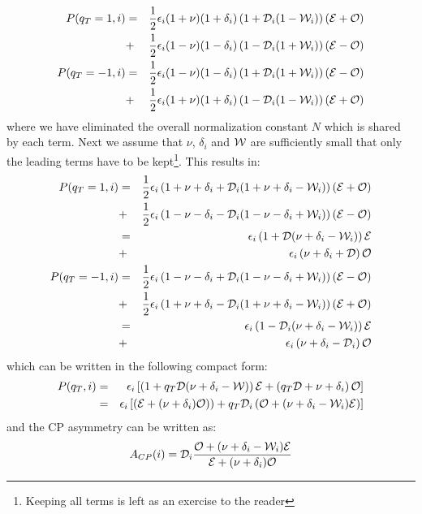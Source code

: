 \documentclass[a4paper,9pt,twoside]{article}
\begin{document}
\begin{eqnarray}
   P(q_T=1,i)  &=&\frac{1}{2} \epsilon_i(1+\nu)(1+\delta_i)\left(1+{\cal D}_i(1-{\cal W}_i)\right)\left({\cal E}+{\cal O}\right)  
\\             &+&\frac{1}{2} \epsilon_i(1-\nu)(1-\delta_i)\left(1-{\cal D}_i(1+{\cal W}_i)\right)\left({\cal E}-{\cal O}\right)  
\\ P(q_T=-1,i) &=&\frac{1}{2} \epsilon_i(1-\nu)(1-\delta_i)\left(1+{\cal D}_i(1+{\cal W}_i)\right)\left({\cal E}-{\cal O}\right) 
\\             &+&\frac{1}{2} \epsilon_i(1+\nu)(1+\delta_i)\left(1-{\cal D}_i(1-{\cal W}_i)\right)\left({\cal E}+{\cal O}\right)
\end{eqnarray}
where we have eliminated the overall normalization constant $N$ which is shared by each term.
Next we assume that $\nu$, $\delta_i$ and ${\cal W}$ are sufficiently small that only the leading 
terms have to be kept\footnote{Keeping all terms is left as an exercise to the reader}. This results in:
\begin{eqnarray}
     P(q_T=1,i)  &=&\frac{1}{2}  \epsilon_i\left(1+\nu+\delta_i+{\cal D}_i(1+\nu+\delta_i-{\cal W}_i)\right)\left({\cal E}+{\cal O}\right)
\\               &+&\frac{1}{2}  \epsilon_i\left(1-\nu-\delta_i-{\cal D}_i(1-\nu-\delta_i+{\cal W}_i)\right)\left({\cal E}-{\cal O}\right)
\\               &=& \epsilon_i\left(1            +{\cal D}(  \nu+\delta_i-{\cal W}_i) \right){\cal E}
\\               &+& \epsilon_i\left( \nu+\delta_i+{\cal D}  \right){\cal O}
\\   P(q_T=-1,i) &=&\frac{1}{2}  \epsilon_i\left(1-\nu-\delta_i+{\cal D}_i(1-\nu-\delta_i+{\cal W}_i)\right)\left({\cal E}-{\cal O}\right)
\\               &+&\frac{1}{2}  \epsilon_i\left(1+\nu+\delta_i-{\cal D}_i(1+\nu+\delta_i-{\cal W}_i)\right)\left({\cal E}+{\cal O}\right)
\\               &=& \epsilon_i\left(1-{\cal D}_i(\nu+\delta_i-{\cal W}_i )  \right){\cal E}
\\               &+& \epsilon_i\left( \nu+\delta_i-{\cal D}_i \right){\cal O}
\end{eqnarray}
which can be written in the following compact form:
\begin{eqnarray}
     P(q_T,i)  &=& \epsilon_i\left[\left(1            +q_T{\cal D}(  \nu+\delta_i-{\cal W}) \right){\cal E} + \left( q_T{\cal D} +\nu+\delta_i \right){\cal O}\right] \\
               &=& \epsilon_i\left[\left({\cal E}+(\nu+\delta_i){\cal O})  \right) + q_T {\cal D}_i \left({\cal O}+(\nu+\delta_i-{\cal W}_i ){\cal E} \right)\right]
\end{eqnarray}
and the CP asymmetry can be written as:
\begin{equation}
  A_{CP}(i) =  {\cal D}_i \frac{{\cal O}+(\nu+\delta_i-{\cal W}_i ){\cal E}}
                               {{\cal E}+(\nu+\delta_i){\cal O} }
\end{equation}
\end{document}
